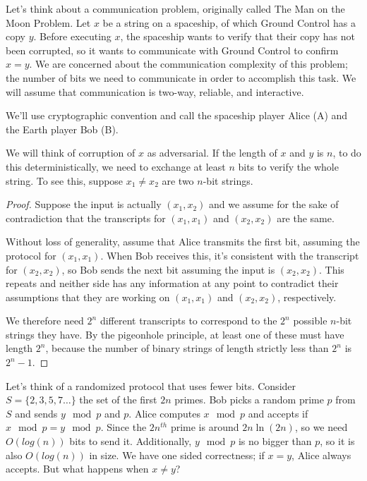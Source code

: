 Let's think about a communication problem, originally called The Man on the Moon Problem.  Let $x$ be a string on a spaceship, of which Ground Control has a copy $y$.  Before executing $x$, the spaceship wants to verify that their copy has not been corrupted, so it wants to communicate with Ground Control to confirm $x=y$.  We are concerned about the communication complexity of this problem; the number of bits we need to communicate in order to accomplish this task.  We will assume that communication is two-way, reliable, and interactive.

We'll use cryptographic convention and call the spaceship player Alice (A) and the Earth player Bob (B).

We will think of corruption of $x$ as adversarial.  If the length of $x$ and $y$ is $n$, to do this deterministically, we need to exchange at least $n$ bits to verify the whole string.  To see this, suppose $x_1\neq x_2$ are two $n$-bit strings.  


\begin{proof}
	
	Suppose the input is actually $(x_1,x_2)$ and we assume for the sake of contradiction that the transcripts for $(x_1,x_1)$ and $(x_2,x_2)$ are the same.
	
	Without loss of generality, assume that Alice transmits the first bit, assuming the protocol for $(x_1,x_1)$.  When Bob receives this, it's consistent with the transcript for $(x_2,x_2)$, so Bob sends the next bit assuming the input is $(x_2,x_2)$.  This repeats and neither side has any information at any point to contradict their assumptions that they are working on $(x_1,x_1)$ and $(x_2,x_2)$, respectively.
	
	We therefore need $2^n$ different transcripts to correspond to the $2^n$ possible $n$-bit strings they have.  By the pigeonhole principle, at least one of these must have length $2^n$, because the number of binary strings of length strictly less than $2^n$ is $2^n -1$.
	
	
	
\end{proof}


Let's think of a randomized protocol that uses fewer bits.  Consider $S=\{2,3,5,7\dots\}$ the set of the first $2n$ primes.  Bob picks a random prime $p$ from $S$ and sends $y\mod p$ and $p$.  Alice computes $x\mod p$ and accepts if $x\mod p = y\mod p$.  Since the $2n^{th}$ prime is around $2n\ln(2n)$, so we need $O(log(n))$ bits to send it.  Additionally, $y\mod p$ is no bigger than $p$, so it is also $O(log(n))$ in size.  We have one sided correctness; if $x=y$, Alice always accepts.  But what happens when $x\neq y$?

